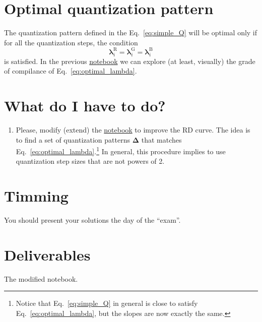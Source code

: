 \section{Optimal quantization pattern}
\label{sec:optimal_RD}
The quantization pattern defined in the Eq.~\eqref{eq:simple_Q} will
be optimal only if for all the quantization steps, the condition
\begin{equation}
  \mathbf{\lambda}^{\text{R}}_i = \mathbf{\lambda}^{\text{G}}_i =
  \mathbf{\lambda}^{\text{B}}_i
  \label{eq:optimal_lambda}
\end{equation}
is satisfied. In the previous
\href{https://github.com/Sistemas-Multimedia/Sistemas-Multimedia.github.io/blob/master/contents/RGB_SQ/RGB_SQ.ipynb}{notebook}
we can explore (at least, visually) the grade of compilance of
Eq.~\eqref{eq:optimal_lambda}.

\section{What do I have to do?}

\begin{enumerate}
\item
  Please, modify (extend) the
  \href{https://github.com/Sistemas-Multimedia/Sistemas-Multimedia.github.io/blob/master/contents/RGB_SQ/RGB_SQ.ipynb}{notebook}
  to improve the RD curve. The idea is to find a set of quantization
  patterns $\mathbf\Delta$ that matches
  Eq.~\eqref{eq:optimal_lambda}.\footnote{Notice that
  Eq.~\eqref{eq:simple_Q} in general is close to satisfy
  Eq.~\eqref{eq:optimal_lambda}, but the slopes are now exactly the
  same.} In general, this procedure implies to use quantization step
  sizes that are not powers of 2.

\end{enumerate}

\section{Timming}

You should present your solutions the day of the ``exam''.

\section{Deliverables}

The modified notebook.

